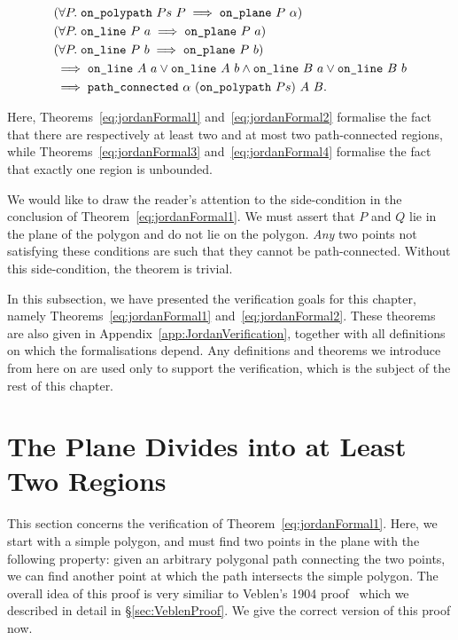 \begin{equation}
  \begin{split}\label{eq:jordanFormal4}
  &(\forall P.\; \code{on\_polypath}\ Ps\ P \implies \code{on\_plane}\ P\ \alpha)\\
  &(\forall P.\; \code{on\_line}\ P\ a \implies \code{on\_plane}\ P\ a)\\
  &(\forall P.\; \code{on\_line}\ P\ b \implies \code{on\_plane}\ P\ b)\\
  &\implies \code{on\_line}\ A\ a \vee \code{on\_line}\ A\ b\wedge 
  \code{on\_line}\ B\ a \vee \code{on\_line}\ B\ b\\
  &\implies \code{path\_connected}\ \alpha\ (\code{on\_polypath}\ Ps)\ A\ B.
\end{split}
\end{equation}

Here, Theorems~\ref{eq:jordanFormal1} and~\ref{eq:jordanFormal2} formalise the fact that there are respectively at least two and at most two path-connected regions, while Theorems~\ref{eq:jordanFormal3} and~\ref{eq:jordanFormal4} formalise the fact that exactly one region is unbounded.

We would like to draw the reader's attention to the side-condition in the conclusion of Theorem~\ref{eq:jordanFormal1}. We must assert that $P$ and $Q$ lie in the plane of the polygon and do not lie on the polygon. \emph{Any} two points not satisfying these conditions are such that they cannot be path-connected. Without this side-condition, the theorem is trivial.

In this subsection, we have presented the verification goals for this chapter, namely Theorems~\ref{eq:jordanFormal1} and~\ref{eq:jordanFormal2}. These theorems are also given in Appendix~\ref{app:JordanVerification}, together with all definitions on which the formalisations depend. Any definitions and theorems we introduce from here on are used only to support the verification, which is the subject of the rest of this chapter.

\section{The Plane Divides into at Least Two Regions}
This section concerns the verification of Theorem~\ref{eq:jordanFormal1}. Here, we start with a simple polygon, and must find two points in the plane with the following property: given an arbitrary polygonal path connecting the two points, we can find another point at which the path intersects the simple polygon. The overall idea of this proof is very similiar to Veblen's 1904 proof~\cite{Veblenphd} which we described in detail in \S\ref{sec:VeblenProof}. We give the correct version of this proof now.

